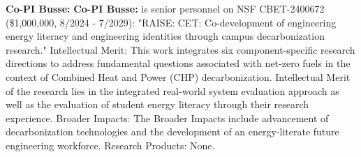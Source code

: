 \documentclass[11pt]{article}
\begin{document}
\noindent\textbf{Co-PI Busse:}
\textbf{Co-PI Busse:} is senior personnel on NSF CBET-2400672 (\$1,000,000, 8/2024 - 7/2029):
"RAISE: CET: Co-development of engineering energy literacy and engineering identities through campus decarbonization research."
Intellectual Merit:
This work integrates six component-specific research directions to address fundamental questions associated with net-zero fuels in the context of Combined Heat and Power (CHP) decarbonization.
Intellectual Merit of the research lies in the integrated real-world system evaluation approach as well as the evaluation of student energy literacy through their research experience. 
Broader Impacts:
The Broader Impacts include advancement of decarbonization technologies and the development of an energy-literate future engineering workforce.  
Research Products: None.

\newpage

\end{document}
